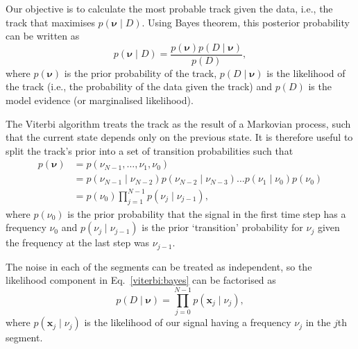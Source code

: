 %
%
Our objective is to calculate the most probable track given the data, i.e., the
track that maximises $p({\bm \nu}\mid D)$. Using Bayes theorem, this posterior probability can
be written as
%
\begin{equation}
\label{viterbi:bayes}
  p({\bm \nu} \mid D) = \frac{p({\bm \nu})p(D \mid {\bm \nu})}{p(D)},
\end{equation}
%
where $p({\bm \nu}) $ is the prior probability of the
track, $p(D \mid{\bm \nu})$ is the likelihood of the track (i.e., the
probability of the data given the track) and $p(D)$ is the model evidence (or
marginalised likelihood).

The Viterbi algorithm treats the track as the result of a Markovian process,
such that the current state depends only on the previous state. It is
therefore useful to split the track's prior into a set of transition
probabilities such that
%
\begin{align}
\label{viterbi:prior}
p({\bm \nu}) &= p(\nu_{N - 1}, \ldots, \nu_1, \nu_0)\nonumber \\
&= p(\nu_{N - 1} \mid \nu_{N-2})p(\nu_{N-2} \mid \nu_{N-3}) \dots p(\nu_1 \mid \nu_0)p(\nu_0) \nonumber \\
&= p(\nu_0)\prod_{j=1}^{N-1}p(\nu_{j} \mid \nu_{j-1}),
\end{align}
%
where $p(\nu_0)$ is the prior probability that the signal in the first time
step has a frequency $\nu_0$ and $p(\nu_{j} \mid \nu_{j-1})$ is the
prior `transition' probability for $\nu_j$ given the frequency at the last
step was $\nu_{j-1}$.

The noise in each of the segments can be treated as independent, so the
likelihood component in Eq.~\ref{viterbi:bayes} can be factorised as
%
\begin{equation}
\label{viterbi:likelihood}
p(D \mid {\bm \nu}) = \prod_{j=0}^{N-1}p({\bm x_j} \mid \nu_j),
\end{equation}
%
 where $p({\bm x_j} \mid \nu_j)$ is the likelihood of our
signal having a frequency $\nu_j$ in the $j$th segment.

